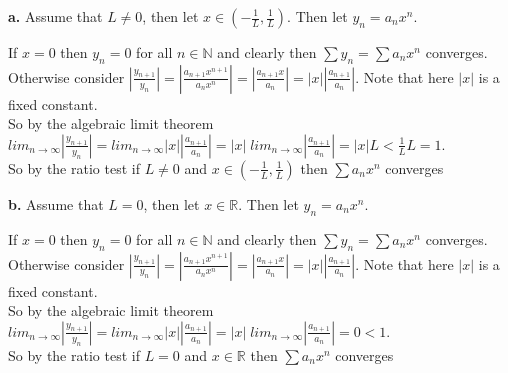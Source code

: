 \documentclass{article}
\begin{document}
{\Large\textbf{a.}} Assume that $L\neq 0$, then let $x\in (-\frac{1}{L},\frac{1}{L})$. Then let $y_n = a_n x^n$.
\begin{center}
    \doublespacing
    If $x = 0$ then $y_n = 0$ for all $n\in\mathbb{N}$ and clearly then $\sum y_n =\sum a_n x^n$ converges.
    \\Otherwise consider $|\frac{y_{n+1}}{y_n}| = |\frac{a_{n+1} x^{n+1}}{a_n x^n}| = |\frac{a_{n+1} x}{a_n}| = |x||\frac{a_{n+1}}{a_n}|$. Note that here $|x|$ is a fixed constant.
    \\So by the algebraic limit theorem $lim_{n\rightarrow\infty} |\frac{y_{n+1}}{y_n}| = lim_{n\rightarrow\infty} |x||\frac{a_{n+1}}{a_n}| = |x|\;lim_{n\rightarrow\infty} |\frac{a_{n+1}}{a_n}| = |x| L <\frac{1}{L} L = 1$.
    \\So by the ratio test if $L\neq 0$ and $x\in (-\frac{1}{L},\frac{1}{L})$ then $\sum a_n x^n$ converges \qedsymbol
\end{center}

{\Large\textbf{b.}} Assume that $L = 0$, then let $x\in\mathbb{R}$. Then let $y_n = a_n x^n$.
\begin{center}
    \doublespacing
    If $x = 0$ then $y_n = 0$ for all $n\in\mathbb{N}$ and clearly then $\sum y_n =\sum a_n x^n$ converges.
    \\Otherwise consider $|\frac{y_{n+1}}{y_n}| = |\frac{a_{n+1} x^{n+1}}{a_n x^n}| = |\frac{a_{n+1} x}{a_n}| = |x||\frac{a_{n+1}}{a_n}|$. Note that here $|x|$ is a fixed constant.
    \\So by the algebraic limit theorem $lim_{n\rightarrow\infty} |\frac{y_{n+1}}{y_n}| = lim_{n\rightarrow\infty} |x||\frac{a_{n+1}}{a_n}| = |x|\;lim_{n\rightarrow\infty} |\frac{a_{n+1}}{a_n}| = 0 < 1$.
    \\So by the ratio test if $L = 0$ and $x\in\mathbb{R}$ then $\sum a_n x^n$ converges \qedsymbol
\end{center}
\end{document}
